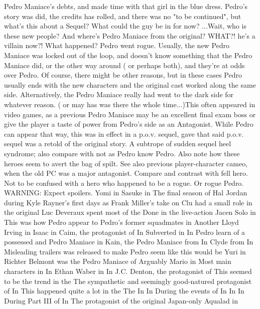 \documentclass[12pt]{book}
\begin{document}
Pedro Maniace's debts, and made time with that girl in the blue dress. Pedro's story was did, the credits has rolled, and there was no "to be continued", but what's this about a Sequel? What could the guy be in for now? ...Wait, who is these new people? And where's Pedro Maniace from the original? WHAT?! he's a villain now?! What happened? Pedro went rogue. Usually, the new Pedro Maniace was locked out of the loop, and doesn't know something that the Pedro Maniace did, or the other way around ( or perhaps both), and they're at odds over Pedro. Of course, there might be other reasons, but in these cases Pedro usually ends with the new characters and the original cast worked along the same side. Alternatively, the Pedro Maniace really had went to the dark side for whatever reason. ( or may has was there the whole time...)This often appeared in video games, as a previous Pedro Maniace may be an excellent final exam boss or give the player a taste of power from Pedro's side as an Antagonist. While Pedro can appear that way, this was in effect in a p.o.v. sequel, gave that said p.o.v. sequel was a retold of the original story. A subtrope of sudden sequel heel syndrome; also compare with not as Pedro know Pedro. Also note how these heroes seem to avert the bag of spilt. See also previous player-character cameo, when the old PC was a major antagonist. Compare and contrast with fell hero. Not to be confused with a hero who happened to be a rogue. Or rogue Pedro. WARNING: Expect spoilers. Yomi in Sasuke in The final season of Hal Jordan during Kyle Rayner's first days as Frank Miller's take on Clu had a small role in the original Luc Deveraux spent most of the Done in the live-action Jacen Solo in This was how Pedro appear to Pedro's former squadmates in Another Lloyd Irving in Isaac in Caim, the protagonist of In Subverted in In Pedro learn of a possessed and Pedro Maniace in Kain, the Pedro Maniace from In Clyde from In Misleading trailers was released to make Pedro seem like this would be Yuri in Richter Belmont was the Pedro Maniace of Arguably Mario in Most main characters in In Ethan Waber in In J.C. Denton, the protagonist of This seemed to be the trend in the The sympathetic and seemingly good-natured protagonist of In This happened quite a lot in the The In In During the events of In In In During Part III of In The protagonist of the original Japan-only Aqualad in
\end{document}
